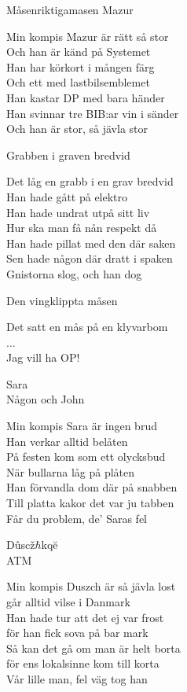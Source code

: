 \begin{song}{Måsen}{riktigamasen}
  {\Large Mazur}
  \begin{vers}
Min kompis Mazur är rätt så stor\\
Och han är känd på Systemet\\
Han har körkort i mången färg\\
Och ett med lastbilsemblemet\\
Han kastar DP med bara händer\\
Han svinnar tre BIB:ar vin i sänder\\
Och han är stor, så jävla stor\\
\end{vers}
 
\newpage
  {\Large Grabben i graven bredvid}
  \begin{vers}
Det låg en grabb i en grav bredvid\\
Han hade gått på elektro\\
Han hade undrat utpå sitt liv\\
Hur ska man få nån respekt då\\
Han hade pillat med den där saken\\
Sen hade någon där dratt i spaken\\
Gnistorna slog, och han dog\\
\end{vers}
 

  {\Large Den vingklippta måsen}
  \begin{vers}
Det satt en mås på en klyvarbom \\
... \\
Jag vill ha OP! \\
\end{vers}
 

  {\Large Sara}\\{\tiny  Någon och John}
  \begin{vers}
Min kompis Sara är ingen brud\\
Han verkar alltid belåten\\
På festen kom som ett olycksbud\\
När bullarna låg på plåten\\
Han förvandla dom där på snabben\\
Till platta kakor det var ju tabben\\
Får du problem, de' Saras fel\\
\end{vers}

{\Large Dûscž$\hbar$kqĕ}\\{\tiny  ATM}
\begin{vers}
Min kompis Duszch är så jävla lost\\
går alltid vilse i Danmark\\
Han hade tur att det ej var frost\\
för han fick sova på bar mark\\
Så kan det gå om man är helt borta\\
för ens lokalsinne kom till korta\\
Vår lille man, fel väg tog han\\
\end{vers}


\end{song}
